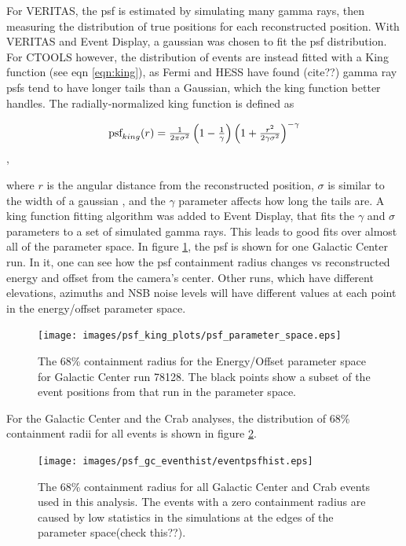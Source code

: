 For VERITAS, the psf is estimated by simulating many gamma rays, then measuring the distribution of true positions for each reconstructed position.
With VERITAS and Event Display, a gaussian was chosen to fit the psf distribution.
For CTOOLS however, the distribution of events are instead fitted with a King function (see eqn \ref{eqn:king}), as Fermi and HESS have found (cite??) gamma ray psfs tend to have longer tails than a Gaussian, which the king function better handles.
The radially-normalized king function is defined as

\begin{equation} \label{eqn:king}
$$ \text{psf}_{king}(r) = \frac{1}{2 \pi \sigma^{2} } \left( 1 - \frac{1}{\gamma} \right) \left( 1 + \frac{ r^{2} }{ 2 \gamma \sigma^{2} } \right)^{-\gamma} $$
\end{equation},

where $r$ is the angular distance from the reconstructed position, $\sigma$ is similar to the width of a gaussian , and the $\gamma$ parameter affects how long the tails are.
A king function fitting algorithm was added to Event Display, that fits the $\gamma$ and $\sigma$ parameters to a set of simulated gamma rays.
This leads to good fits over almost all of the parameter space.
In figure \ref{fig:psf_paramspace}, the psf is shown for one Galactic Center run.
In it, one can see how the psf containment radius changes vs reconstructed energy and offset from the camera's center.
Other runs, which have different elevations, azimuths and NSB noise levels will have different values at each point in the energy/offset parameter space.

\begin{figure}[ht]
  \begin{center}
    \texttt{[image: images/psf\_king\_plots/psf\_parameter\_space.eps]}
    \caption[PSF Parameter Space]{The 68\% containment radius for the Energy/Offset parameter space for Galactic Center run 78128. The black points show a subset of the event positions from that run in the parameter space.}\label{fig:psf_paramspace}
  \end{center}
\end{figure}

For the Galactic Center and the Crab analyses, the distribution of 68\% containment radii for all events is shown in figure \ref{fig:gc_psf_hist}.

\begin{figure}[ht]
  \begin{center}
    \texttt{[image: images/psf\_gc\_eventhist/eventpsfhist.eps]}
    \caption[Crab and Galactic Center Event PSFs]{The 68\% containment radius for all Galactic Center and Crab events used in this analysis.  The events with a zero containment radius are caused by low statistics in the simulations at the edges of the parameter space(check this??).}\label{fig:gc_psf_hist}
  \end{center}
\end{figure}

